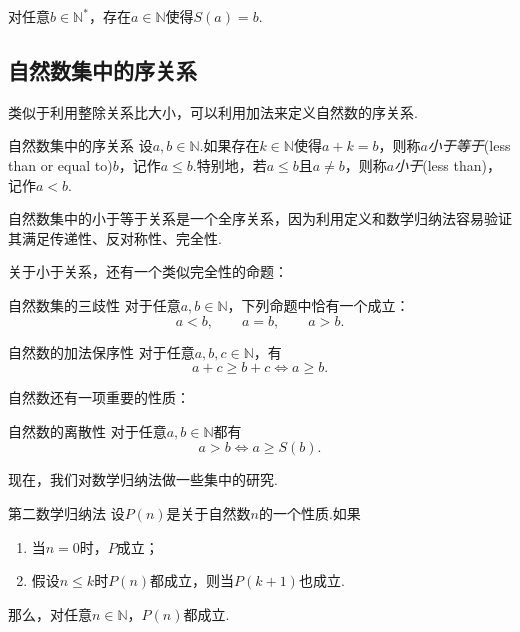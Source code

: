 \begin{proposition}
	对任意$b \in \mathbb{N}^*$，存在$a \in \mathbb{N}$使得$S(a)=b$.
\end{proposition}

\subsection{自然数集中的序关系}

类似于利用整除关系比大小，可以利用加法来定义自然数的序关系.

\begin{definition}{自然数集中的序关系}
	设$a,b \in \mathbb{N}$.如果存在$k \in \mathbb{N}$使得$a+k=b$，则称$a$\textit{小于等于}(less than or equal to)$b$，记作$a \leq b$.特别地，若$a \leq b$且$a \neq b$，则称$a$\textit{小于}(less than)，记作$a<b$.
\end{definition}

自然数集中的小于等于关系是一个全序关系，因为利用定义和数学归纳法容易验证其满足传递性、反对称性、完全性.

关于小于关系，还有一个类似完全性的命题：

\begin{proposition}{自然数集的三歧性}
	对于任意$a,b \in \mathbb{N}$，下列命题中恰有一个成立：$$a<b, \qquad a=b, \qquad a>b.$$
\end{proposition}


\begin{proposition}{自然数的加法保序性}
	对于任意$a,b,c \in \mathbb{N}$，有$$a+c \geq b+c \Leftrightarrow a \geq b.$$
\end{proposition}

自然数还有一项重要的性质：

\begin{proposition}{自然数的离散性}
	对于任意$a,b \in \mathbb{N}$都有$$a>b \Leftrightarrow a \geq S(b).$$
\end{proposition}

现在，我们对数学归纳法做一些集中的研究.

\begin{theorem}{第二数学归纳法}
	设$P(n)$是关于自然数$n$的一个性质.如果
	\begin{enumerate}
		\item 当$n=0$时，$P$成立；
		\item 假设$n \leq k$时$P(n)$都成立，则当$P(k+1)$也成立.
	\end{enumerate}
	那么，对任意$n \in \mathbb{N}$，$P(n)$都成立.
\end{theorem}

